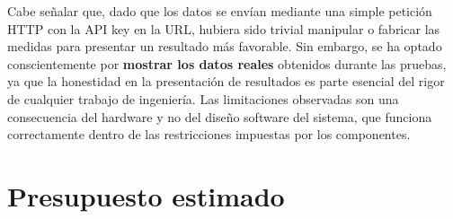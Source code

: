 \documentclass[12pt, a4paper]{article}
\begin{document}
Cabe señalar que, dado que los datos se envían mediante una simple petición HTTP
con la API key en la URL, hubiera sido trivial manipular o fabricar las medidas para
presentar un resultado más favorable. Sin embargo, se ha optado conscientemente por
\textbf{mostrar los datos reales} obtenidos durante las pruebas, ya que la honestidad
en la presentación de resultados es parte esencial del rigor de cualquier trabajo de
ingeniería. Las limitaciones observadas son una consecuencia del hardware y no del
diseño software del sistema, que funciona correctamente dentro de las restricciones
impuestas por los componentes.

\newpage

\section{Presupuesto estimado}
\end{document}
